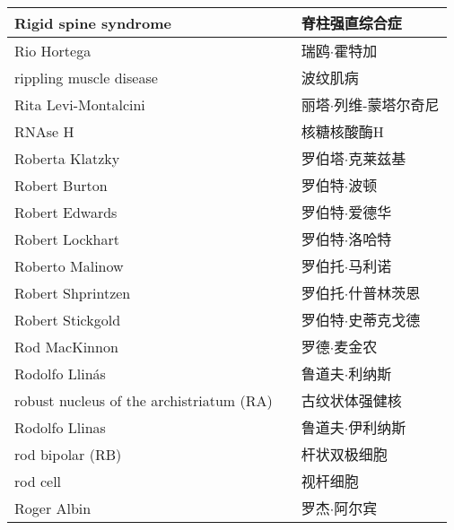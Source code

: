 \begin{longtable}{lll}
	\midrule
	Rigid spine syndrome  && 脊柱强直综合症  \\
	
	\midrule
	Rio Hortega   && 瑞鸥$\cdot$霍特加  \\
	
	\midrule
	rippling muscle disease   && 波纹肌病  \\
	
	\midrule
	Rita Levi-Montalcini   && 丽塔$\cdot$列维-蒙塔尔奇尼  \\
	
	\midrule
	RNAse H   && 核糖核酸酶H  \\
	
	\midrule
	Roberta Klatzky   && 罗伯塔$\cdot$克莱兹基  \\
	
	\midrule
	Robert Burton   && 罗伯特$\cdot$波顿  \\
	
	\midrule
	Robert Edwards   && 罗伯特$\cdot$爱德华  \\
	
	\midrule
	Robert Lockhart   && 罗伯特$\cdot$洛哈特  \\
	
	\midrule
	Roberto Malinow   && 罗伯托$\cdot$马利诺  \\
	
	\midrule
	Robert Shprintzen   && 罗伯托$\cdot$什普林茨恩  \\
	
	\midrule
	Robert Stickgold   && 罗伯特$\cdot$史蒂克戈德  \\
	
	\midrule
	Rod MacKinnon   && 罗德$\cdot$麦金农  \\
	
	\midrule
	Rodolfo Llinás   && 鲁道夫$\cdot$利纳斯  \\
	
	\midrule
	robust nucleus of the archistriatum (RA)   && 古纹状体强健核  \\
	
	\midrule
	Rodolfo Llinas   && 鲁道夫$\cdot$伊利纳斯  \\
	
	\midrule
	rod bipolar (RB)  && 杆状双极细胞  \\
	
	\midrule
	rod cell   && 视杆细胞  \\
	
	\midrule
	Roger Albin   && 罗杰$\cdot$阿尔宾  \\
	

\end{longtable}
